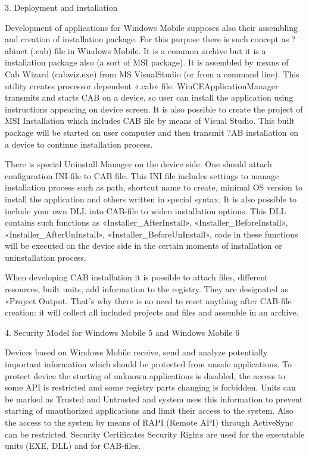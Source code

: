 3. Deployment and installation

Development of applications for Windows Mobile supposes also their assembling and
creation of installation package. For this purpose there is such concept as
?abinet (.cab) file in Windows Mobile. It is a common archive but it is a
installation package also (a sort of MSI package). It is assembled by means of
Cab Wizard (cabwiz.exe) from MS VisualStudio (or from a command line). This
utility creates processor dependent «.cab» file. WinCEApplicationManager
transmits and starts CAB on a device, so user can install the application using
instructions appearing on device screen. It is also possible to create the
project of MSI Installation which includes CAB file by means of Visual Studio.
This built package will be started on user computer and then transmit ?AB
installation on a device to continue installation process.

There is special Uninstall Manager on the device side. One should attach
configuration INI-file to CAB file. This INI file includes settings to manage
installation process such as path, shortcut name to create, minimal OS version to
install the application and others written in special syntax. It is also possible
to include your own DLL into CAB-file to widen installation options. This DLL
contains such functions as «Installer\_AfterInstall»,
«Installer\_BeforeInstall», «Installer\_AfterUnInstall»,
«Installer\_BeforeUnInstall», code in these functions will be executed on the
device side in the certain moments of installation or uninstallation process.

When developing CAB installation it is possible to attach files, different
resources, built units, add information to the registry. They are designated as
«Project Output. That’s why there is no need to reset anything after CAB-file
creation: it will collect all included projects and files and assemble in an
archive.

4. Security Model for Windows Mobile 5 and Windows Mobile 6

Devices based on Windows Mobile receive, send and analyze potentially important
information which should be protected from unsafe applications. To protect device
the starting of unknown applications is disabled, the access to some API is
restricted and some registry parts changing is forbidden. Units can be marked as
Trusted and Untrusted and system uses this information to prevent starting of
unauthorized applications and limit their access to the system. Also the access
to the system by means of RAPI (Remote API) through ActiveSync can be restricted.
Security Certificates Security Rights are used for the executable units (EXE,
DLL) and for CAB-files.

